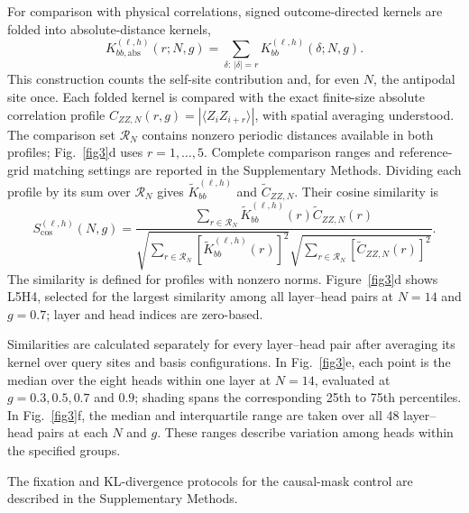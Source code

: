\documentclass[pdflatex,sn-nature]{sn-jnl}%
\theoremstyle{thmstyleone}%
\theoremstyle{thmstyletwo}%
\theoremstyle{thmstylethree}%
\begin{document}
For comparison with physical correlations, signed outcome-directed kernels are folded into absolute-distance kernels,
\begin{equation}
\label{eq:attention_absolute_kernel}
K_{bb,\mathrm{abs}}^{(\ell,h)}(r;N,g)
=\sum_{\delta:\,|\delta|=r}K_{bb}^{(\ell,h)}(\delta;N,g).
\end{equation}
This construction counts the self-site contribution and, for even \(N\), the antipodal site once. Each folded kernel is compared with the exact finite-size absolute correlation profile \(C_{ZZ,N}(r,g)=|\langle Z_iZ_{i+r}\rangle|\), with spatial averaging understood. The comparison set \(\mathcal{R}_N\) contains nonzero periodic distances available in both profiles; Fig.~\ref{fig3}d uses \(r=1,\ldots,5\). Complete comparison ranges and reference-grid matching settings are reported in the Supplementary Methods. Dividing each profile by its sum over \(\mathcal{R}_N\) gives \(\widetilde K_{bb}^{(\ell,h)}\) and \(\widetilde C_{ZZ,N}\). Their cosine similarity is
\begin{equation}
\label{eq:attention_correlation_cosine}
S_{\mathrm{cos}}^{(\ell,h)}(N,g)
=\frac{\sum_{r\in\mathcal{R}_N}
\widetilde K_{bb}^{(\ell,h)}(r)\widetilde C_{ZZ,N}(r)}
{\sqrt{\sum_{r\in\mathcal{R}_N}[\widetilde K_{bb}^{(\ell,h)}(r)]^2}
\sqrt{\sum_{r\in\mathcal{R}_N}[\widetilde C_{ZZ,N}(r)]^2}}.
\end{equation}
The similarity is defined for profiles with nonzero norms. Figure~\ref{fig3}d shows L5H4, selected for the largest similarity among all layer--head pairs at \(N=14\) and \(g=0.7\); layer and head indices are zero-based.

Similarities are calculated separately for every layer--head pair after averaging its kernel over query sites and basis configurations. In Fig.~\ref{fig3}e, each point is the median over the eight heads within one layer at \(N=14\), evaluated at \(g=0.3,0.5,0.7\) and \(0.9\); shading spans the corresponding 25th to 75th percentiles. In Fig.~\ref{fig3}f, the median and interquartile range are taken over all 48 layer--head pairs at each \(N\) and \(g\). These ranges describe variation among heads within the specified groups.

The fixation and KL-divergence protocols for the causal-mask control are described in the Supplementary Methods.




\end{document}
